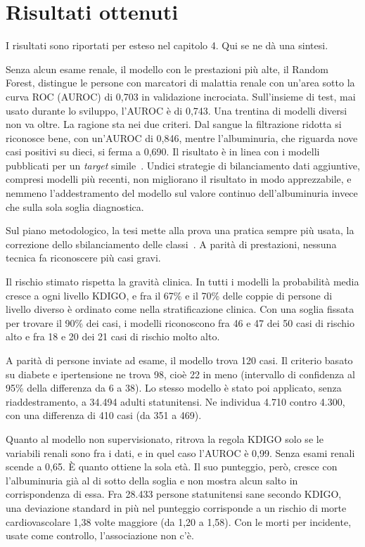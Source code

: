 \documentclass[a4paper, 12pt, oneside]{book}
\begin{document}
\section{Risultati ottenuti}
I risultati sono riportati per esteso nel capitolo 4. Qui se ne dà una sintesi.

Senza alcun esame renale, il modello con le prestazioni più alte, il Random Forest, distingue le persone con marcatori di malattia renale con un'area sotto la curva ROC (AUROC) di 0,703 in validazione incrociata. Sull'insieme di test, mai usato durante lo sviluppo, l'AUROC è di 0,743. Una trentina di modelli diversi non va oltre. La ragione sta nei due criteri. Dal sangue la filtrazione ridotta si riconosce bene, con un'AUROC di 0,846, mentre l'albuminuria, che riguarda nove casi positivi su dieci, si ferma a 0,690. Il risultato è in linea con i modelli pubblicati per un \textit{target} simile~\cite{yoo_merwacs_2026,muntner_development_2011}. Undici strategie di bilanciamento dati aggiuntive, compresi modelli più recenti, non migliorano il risultato in modo apprezzabile, e nemmeno l'addestramento del modello sul valore continuo dell'albuminuria invece che sulla sola soglia diagnostica.

Sul piano metodologico, la tesi mette alla prova una pratica sempre più usata, la correzione dello sbilanciamento delle classi~\cite{van_den_goorbergh_harm_2022}. A parità di prestazioni, nessuna tecnica fa riconoscere più casi gravi. 

Il rischio stimato rispetta la gravità clinica. In tutti i modelli la probabilità media cresce a ogni livello KDIGO, e fra il 67\% e il 70\% delle coppie di persone di livello diverso è ordinato come nella stratificazione clinica. Con una soglia fissata per trovare il 90\% dei casi, i modelli riconoscono fra 46 e 47 dei 50 casi di rischio alto e fra 18 e 20 dei 21 casi di rischio molto alto.

A parità di persone inviate ad esame, il modello trova 120 casi. Il criterio basato su diabete e ipertensione ne trova 98, cioè 22 in meno (intervallo di confidenza al 95\% della differenza da 6 a 38). Lo stesso modello è stato poi applicato, senza riaddestramento, a 34.494 adulti statunitensi. Ne individua 4.710 contro 4.300, con una differenza di 410 casi (da 351 a 469).

Quanto al modello non supervisionato, ritrova la regola KDIGO solo se le variabili renali sono fra i dati, e in quel caso l'AUROC è 0,99. Senza esami renali scende a 0,65. È quanto ottiene la sola età. Il suo punteggio, però, cresce con l'albuminuria già al di sotto della soglia e non mostra alcun salto in corrispondenza di essa. Fra 28.433 persone statunitensi sane secondo KDIGO, una deviazione standard in più nel punteggio corrisponde a un rischio di morte cardiovascolare 1,38 volte maggiore (da 1,20 a 1,58). Con le morti per incidente, usate come controllo, l'associazione non c'è.
\end{document}
